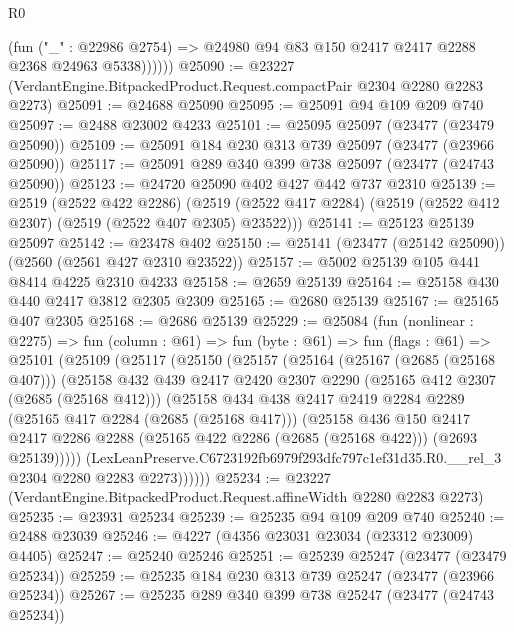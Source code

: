 \begin{lexlean}{R0}
\begin{coremodule}
              (fun ("_" : @22986 @2754) =>
              @24980 @94 @83 @150 @2417 @2417 @2288 @2368 @24963 @5338))))))
@25090 := @23227 (VerdantEngine.BitpackedProduct.Request.compactPair @2304 @2280 @2283 @2273)
@25091 := @24688 @25090
@25095 := @25091 @94 @109 @209 @740
@25097 := @2488 @23002 @4233
@25101 := @25095 @25097 (@23477 (@23479 @25090))
@25109 := @25091 @184 @230 @313 @739 @25097 (@23477 (@23966 @25090))
@25117 := @25091 @289 @340 @399 @738 @25097 (@23477 (@24743 @25090))
@25123 := @24720 @25090 @402 @427 @442 @737 @2310
@25139 := @2519
    (@2522 @422 @2286)
    (@2519 (@2522 @417 @2284) (@2519 (@2522 @412 @2307) (@2519 (@2522 @407 @2305) @23522)))
@25141 := @25123 @25139 @25097
@25142 := @23478 @402
@25150 := @25141 (@23477 (@25142 @25090)) (@2560 (@2561 @427 @2310 @23522))
@25157 := @5002 @25139 @105 @441 @8414 @4225 @2310 @4233
@25158 := @2659 @25139
@25164 := @25158 @430 @440 @2417 @3812 @2305 @2309
@25165 := @2680 @25139
@25167 := @25165 @407 @2305
@25168 := @2686 @25139
@25229 := @25084
    (fun (nonlinear : @2275) =>
    fun (column : @61) =>
    fun (byte : @61) =>
    fun (flags : @61) =>
    @25101
      (@25109
        (@25117
          (@25150
            (@25157
              (@25164
                (@25167 (@2685 (@25168 @407)))
                (@25158
                  @432
                  @439
                  @2417
                  @2420
                  @2307
                  @2290
                  (@25165 @412 @2307 (@2685 (@25168 @412)))
                  (@25158
                    @434
                    @438
                    @2417
                    @2419
                    @2284
                    @2289
                    (@25165 @417 @2284 (@2685 (@25168 @417)))
                    (@25158
                      @436
                      @150
                      @2417
                      @2417
                      @2286
                      @2288
                      (@25165 @422 @2286 (@2685 (@25168 @422)))
                      (@2693 @25139)))))
              (LexLeanPreserve.C6723192fb6979f293dfc797c1ef31d35.R0.__rel_3
                @2304
                @2280
                @2283
                @2273))))))
@25234 := @23227 (VerdantEngine.BitpackedProduct.Request.affineWidth @2280 @2283 @2273)
@25235 := @23931 @25234
@25239 := @25235 @94 @109 @209 @740
@25240 := @2488 @23039
@25246 := @4227 (@4356 @23031 @23034 (@23312 @23009) @4405)
@25247 := @25240 @25246
@25251 := @25239 @25247 (@23477 (@23479 @25234))
@25259 := @25235 @184 @230 @313 @739 @25247 (@23477 (@23966 @25234))
@25267 := @25235 @289 @340 @399 @738 @25247 (@23477 (@24743 @25234))

\end{coremodule}
\end{lexlean}
